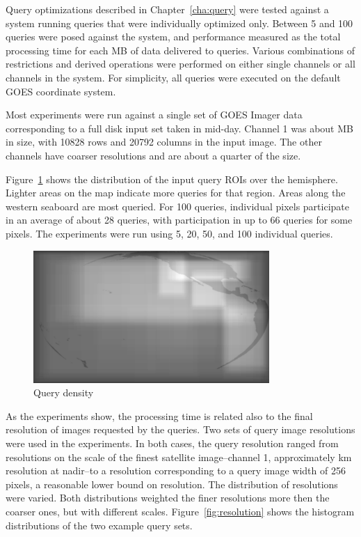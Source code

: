 \documentclass{ucdthesis}       %
\begin{document}
Query optimizations described in Chapter~\ref{cha:query} were tested
against a system running queries that were individually optimized
only.  Between 5 and 100 queries were posed against the system, and
performance measured as the total processing time for each MB of data
delivered to queries.  Various combinations of restrictions and
derived operations were performed on either single channels or all
channels in the system.  For simplicity, all queries were executed on
the default \ac{GOES} coordinate system.

Most experiments were run against a single set of \ac{GOES} Imager
data corresponding to a full disk input set taken in mid-day.  Channel
1 was about \unit[440]{MB} in size, with 10828 rows and 20792 columns
in the input image.  The other channels have coarser resolutions and
are about a quarter of the size.

Figure~\ref{fig:density} shows the distribution of the input query
\acp{ROI} over the hemisphere.  Lighter areas on the map indicate more
queries for that region.  Areas along the western seaboard are most
queried.  For 100 queries, individual pixels participate in an average
of about 28 queries, with participation in up to 66 queries for some
pixels.  The experiments were run using 5, 20, 50, and 100 individual
queries.

\begin{figure}[htb]
  \centering
  \includegraphics[width=0.8\textwidth]{figs/density/density}
  \caption{Query density}
  \label{fig:density}
\end{figure}

As the experiments show, the processing time is related also to the
final resolution of images requested by the queries.  Two sets of
query image resolutions were used in the experiments.  In both cases,
the query resolution ranged from resolutions on the scale of the
finest satellite image--channel 1, approximately \unit[1]{km}
resolution at nadir--to a resolution corresponding to a query image
width of 256 pixels, a reasonable lower bound on resolution.  The
distribution of resolutions were varied.  Both distributions weighted
the finer resolutions more then the coarser ones, but with different
scales.  Figure~\ref{fig:resolution} shows the histogram distributions
of the two example query sets.
\end{document}
